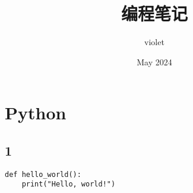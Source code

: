 \documentclass[12pt, a4paper, oneside]{ctexbook}
\title{\Huge{\textbf{编程笔记}}}
\author{violet}
\date{May 2024}
\begin{document}
\maketitle

\setcounter{page}{1}

\newpage
{}
\setcounter{page}{1}
\tableofcontents
\newpage
\setcounter{page}{1}

\chapter {Python}

\section{1}

\begin{verbatim}
def hello_world():
    print("Hello, world!")
\end{verbatim}
\end{document}
